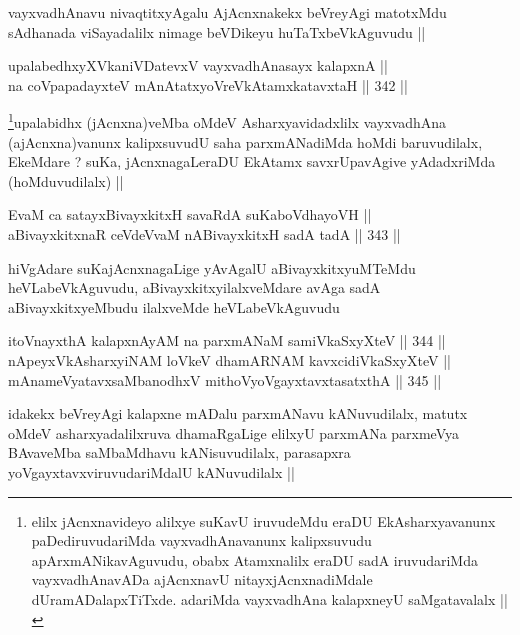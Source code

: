 \begin{artha}
vayxvadhAnavu nivaqtitxyAgalu AjAcnxnakekx beVreyAgi matotxMdu
sAdhanada viSayadalilx nimage beVDikeyu huTaTxbeVkAguvudu ||
\end{artha}

\begin{shl}
upalabedhxyXVkaniVDatevxV vayxvadhAnasayx kalapxnA || \\
na coVpapadayxteV mAnAtatxyoVreVkAtamxkatavxtaH ||  342 ||  
\end{shl}

\begin{artha}
\footnote{elilx jAcnxnavideyo alilxye suKavU iruvudeMdu eraDU
  EkAsharxyavanunx paDediruvudariMda vayxvadhAnavanunx kalipxsuvudu
  apArxmANikavAguvudu, obabx Atamxnalilx eraDU sadA iruvudariMda
  vayxvadhAnavADa ajAcnxnavU nitayxjAcnxnadiMdale
  dUramADalapxTiTxde. adariMda vayxvadhAna kalapxneyU saMgatavalalx ||}upalabidhx (jAcnxna)veMba oMdeV Asharxyavidadxlilx
  vayxvadhAna (ajAcnxna)vanunx kalipxsuvudU saha parxmANadiMda hoMdi
  baruvudilalx, EkeMdare ? suKa, jAcnxnagaLeraDU EkAtamx
  savxrUpavAgive yAdadxriMda (hoMduvudilalx) ||
\end{artha}


\begin{shl}
EvaM ca satayxBivayxkitxH savaRdA suKaboVdhayoVH || \\
aBivayxkitxnaR ceVdeVvaM nABivayxkitxH sadA tadA ||  343 ||  
\end{shl}

\begin{artha}
hiVgAdare suKajAcnxnagaLige yAvAgalU aBivayxkitxyuMTeMdu
heVLabeVkAguvudu, aBivayxkitxyilalxveMdare avAga sadA
aBivayxkitxyeMbudu ilalxveMde heVLabeVkAguvudu
\end{artha}

\begin{shl}
itoV\s nayxthA kalapxnAyAM na parxmANaM samiVkaSxyXteV ||  344 ||  \\
nApeyxVkAsharxyiNAM loVkeV dhamARNAM kavxcidiVkaSxyXteV || \\
mAnameVyatavxsaMbanodhxV mithoVyoVgayxtavxtasatxthA ||  345 ||  
\end{shl}

\begin{artha}
idakekx beVreyAgi kalapxne mADalu parxmANavu kANuvudilalx, matutx
oMdeV asharxyadalilxruva dhamaRgaLige elilxyU parxmANa parxmeVya
BAvaveMba saMbaMdhavu kANisuvudilalx, parasapxra
yoVgayxtavxviruvudariMdalU kANuvudilalx ||
\end{artha}

